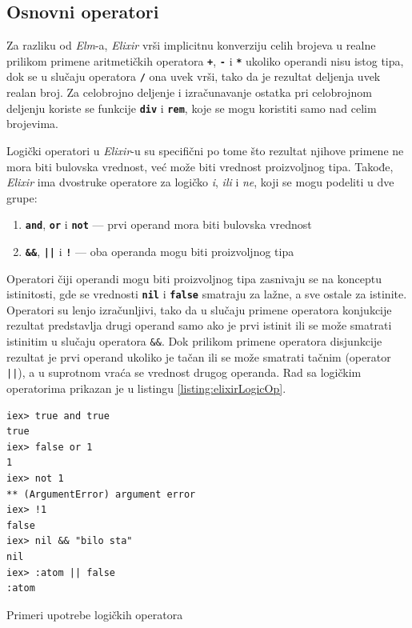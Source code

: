 \documentclass[12pt,oneside]{memoir}
\begin{document}
\subsection{Osnovni operatori}
Za razliku od \emph{Elm}-a, \emph{Elixir} vrši implicitnu konverziju celih brojeva u realne prilikom
primene aritmetičkih operatora \textbf{\texttt{+}}, \textbf{\texttt{-}} i
\textbf{\texttt{*}} ukoliko operandi nisu istog tipa, dok se u slučaju operatora
\textbf{\texttt{/}} ona uvek vrši, tako da je rezultat deljenja uvek realan broj. Za 
celobrojno deljenje i izračunavanje ostatka pri celobrojnom deljenju koriste se funkcije 
\textbf{\texttt{div}} i \textbf{\texttt{rem}}, koje se mogu koristiti samo nad celim brojevima.

Logički operatori u \emph{Elixir}-u su specifični po tome što rezultat njihove primene ne mora
biti bulovska vrednost, već može biti vrednost proizvoljnog tipa. Takođe, \emph{Elixir} ima dvostruke operatore
za logičko \emph{i}, \emph{ili} i \emph{ne}, koji se mogu podeliti u dve grupe:
\begin{enumerate}
  \item \textbf{\texttt{and}}, \textbf{\texttt{or}} i \textbf{\texttt{not}} --- prvi operand
  mora biti bulovska vrednost
  \item \textbf{\texttt{\&\&}}, \textbf{\texttt{||}} i \textbf{\texttt{!}} --- oba operanda 
  mogu biti proizvoljnog tipa
\end{enumerate}
Operatori čiji operandi mogu biti proizvoljnog tipa zasnivaju se na konceptu istinitosti, gde
se vrednosti \textbf{\texttt{nil}} i \textbf{\texttt{false}} smatraju za lažne, a sve ostale
za istinite. Operatori su lenjo izračunljivi, tako da u slučaju primene operatora konjukcije
rezultat predstavlja drugi operand samo ako je prvi istinit ili se može smatrati istinitim
u slučaju operatora \texttt{\&\&}. Dok prilikom primene operatora disjunkcije rezultat je
prvi operand ukoliko je tačan ili se može smatrati tačnim (operator \texttt{||}), a u suprotnom vraća
se vrednost drugog operanda. Rad sa logičkim operatorima prikazan je u listingu
\ref{listing:elixirLogicOp}.
\begin{listing}[!h]
\begin{verbatim}
iex> true and true
true
iex> false or 1
1
iex> not 1
** (ArgumentError) argument error
iex> !1
false
iex> nil && "bilo sta"
nil
iex> :atom || false
:atom
\end{verbatim}
\caption{Primeri upotrebe logičkih operatora}
\label{listing:elixirLogicOp}
\end{listing}
\end{document}
